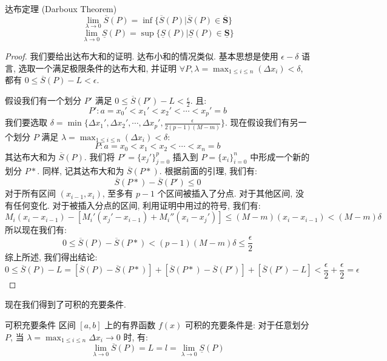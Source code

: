 \documentclass[a4paper,12pt]{ctexart}
\begin{document}
\begin{mylemma}{达布定理 (Darboux Theorem)}{}
$$
\lim_{\lambda \to 0} \overline{S}(P) = \inf \{\overline{S}(P)|\overline{S}(P) \in \overline{\textbf{S}}\}
$$
$$
\lim_{\lambda \to 0} \underline{S}(P) = \sup \{\underline{S}(P)|\underline{S}(P) \in \underline{\textbf{S}}\}
$$
\end{mylemma}

\begin{proof}
我们要给出达布大和的证明. 达布小和的情况类似. 基本思想是使用 $\epsilon - \delta$ 语言, 选取一个满足极限条件的达布大和, 并证明 $\forall P, \lambda = \max_{1 \leq i \leq n} (\Delta x_i) < \delta$, 都有 $0 \leq \overline{S}(P)-L < \epsilon$.

假设我们有一个划分 $P'$ 满足 $0 \leq \overline{S}(P') - L < \frac{\epsilon}{2}$. 且: 
$$
P' : a = x_0' <x_1' < x_2' < \cdots < x_p' = b
$$
我们要选取 $\delta = \min \{\Delta x_1', \Delta x_2', \cdots , \Delta x_p', \frac{\epsilon}{2(p-1)(M-m)}\}$. 现在假设我们有另一个划分 $P$ 满足 $\lambda = \max_{1 \leq i \leq n} (\Delta x_i) < \delta$: 
$$
P: a = x_0 < x_1 < x_2 < \cdots <x_n = b
$$
其达布大和为 $\overline{S}(P)$. 我们将 $P' = \{x_j'\}^p_{j=0}$ 插入到 $P = \{x_i\}^n_{i=0}$ 中形成一个新的划分 $P*$. 同样, 记其达布大和为 $\overline{S}(P*)$. 根据前面的引理, 我们有: 
$$
\overline{S}(P*)-\overline{S}(P') \leq 0
$$
对于所有区间 $(x_{i-1},x_i)$, 至多有 $p-1$ 个区间被插入了分点. 对于其他区间, 没有任何变化. 对于被插入分点的区间, 利用证明中用过的符号, 我们有: 
$$
M_i(x_i-x_{i-1})-[M_i'(x_j'-x_{i-1})+M_i''(x_i-x_j')] \leq (M-m) (x_i-x_{i-1}) < (M-m) \delta
$$
所以现在我们有: 
$$
0 \leq \overline{S}(P)-\overline{S}(P*)<(p-1)(M-m)\delta \leq \frac{\epsilon}{2}
$$
综上所述, 我们得出结论: 
$$
0 \leq \overline{S}(P)-L = [\overline{S}(P)-\overline{S}(P*)]+[\overline{S}(P*)-\overline{S}(P')]+[\overline{S}(P')-L]<\frac{\epsilon}{2}+\frac{\epsilon}{2}=\epsilon
$$
\end{proof}

现在我们得到了可积的充要条件.

\begin{mythm}{可积充要条件}{}
区间 $[a,b]$ 上的有界函数 $f(x)$ 可积的充要条件是: 对于任意划分 $P$, 当 $\lambda = \max_{1 \leq i \leq n} \Delta x_i \to 0$ 时, 有: 
$$
\lim_{\lambda \to 0} \overline{S}(P) = L = l = \lim_{\lambda \to 0} \underline{S}(P)
$$
\end{mythm}
\end{document}
